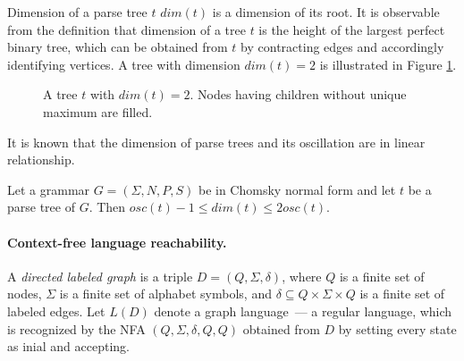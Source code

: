 Dimension of a parse tree $t$ $dim(t)$ is a dimension of its root.  It is observable from the definition that dimension of a tree $t$ is the height of the largest perfect binary tree, which can be obtained from $t$ by contracting edges and accordingly identifying vertices. A tree with dimension $dim(t) = 2$ is illustrated in Figure \ref{oscbtree}.
\begin{figure}
\centering
{}
\caption{A tree $t$ with $dim(t)=2$. Nodes having children without unique maximum are filled.}
\label{oscbtree}            
\end{figure}


It is known that the dimension of parse trees and its oscillation are in linear relationship.

\begin{lemma}
\label{boscdim}
Let a grammar $G = (\Sigma, N, P, S)$ be in Chomsky normal form and let $t$ be a parse tree of $G$. Then $osc(t) - 1 \le dim(t) \le 2osc(t)$.
\end{lemma}
\paragraph{Context-free language reachability.} 
A \textit{directed labeled graph} is a triple $D = (Q, \Sigma, \delta)$, where $Q$ is a finite set of nodes, $\Sigma$ is a finite set of alphabet symbols,
and $\delta \subseteq Q \times \Sigma \times Q$ is a finite set of labeled edges. Let $L(D)$ denote a graph language~--- a regular language, which is recognized by the NFA $(Q,\Sigma ,\delta ,Q, Q)$ obtained from $D$ by setting every state as inial and accepting.


